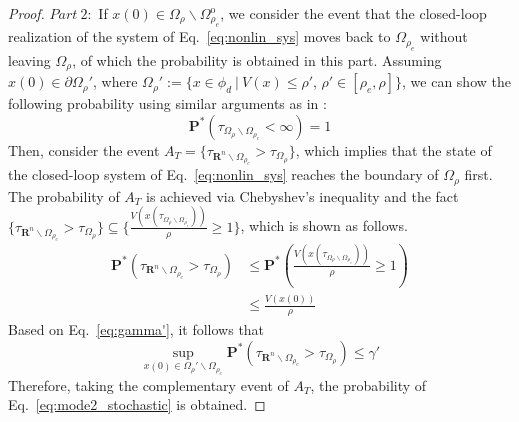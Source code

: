 \documentclass[letterpaper, 10pt, conference]{ieeeconf}
\begin{document}
\begin{proof}
$Part ~2:$
If $x(0) \in \Omega_{\rho} \backslash \Omega_{\rho_e}^{\text{o}}$, we consider the event that the closed-loop realization of the system of Eq.~\ref{eq:nonlin_sys} moves back to $\Omega_{\rho_e}$ without leaving $\Omega_{\rho}$, of which the probability is obtained in this part. Assuming $x(0) \in \partial \Omega_{\rho}'$, where $\Omega_{\rho}' := \{ x \in \phi_d ~|~ V(x) \leq \rho'$, $\rho' \in [\rho_e,\rho]\}$, we can show the following probability using similar arguments as in \cite{battilotti2003stabilization}:
\begin{equation}
\mathbf{P}^*(\tau_{\Omega_{\rho} \backslash \Omega_{\rho_e}} < \infty) = 1
\end{equation}
Then, consider the event $A_T = \{ \tau_{\mathbf{R}^n \backslash \Omega_{\rho_e}} > \tau_{\Omega_{\rho}} \}$, which implies that the state of the closed-loop system of Eq.~\ref{eq:nonlin_sys} reaches the boundary of $\Omega_{\rho}$ first. The probability of $A_T$ is achieved via Chebyshev's inequality and the fact $\{ \tau_{\mathbf{R}^n \backslash \Omega_{\rho_e}} > \tau_{\Omega_{\rho}}  \} \subseteq \{\frac{V(x(\tau_{\Omega_{\rho} \backslash \Omega_{\rho_e}}))}{\rho} \geq 1\}$, which is shown as follows.
\begin{equation}\label{p_compare}
\begin{aligned}
\mathbf{P}^*(\tau_{\mathbf{R}^n \backslash \Omega_{\rho_e}} > \tau_{\Omega_{\rho}}  ) &\leq \mathbf{P}^*(\frac{V(x(\tau_{\Omega_{\rho} \backslash \Omega_{\rho_e}}))}{\rho} \geq 1)\\
& \leq \frac{V(x(0))}{\rho}
\end{aligned}
\end{equation}
Based on Eq.~\ref{eq:gamma'}, it follows that
\begin{equation}
\sup \limits_{x(0) \in \Omega_{\rho}' \backslash \Omega_{\rho_e}} \mathbf{P}^*(\tau_{\mathbf{R}^n \backslash \Omega_{\rho_e}} > \tau_{\Omega_{\rho} }) \leq \gamma'
\end{equation} Therefore, %
 taking the complementary event of $A_T$, the probability of Eq.~\ref{eq:mode2_stochastic} is obtained. 




\end{proof}
\end{document}
